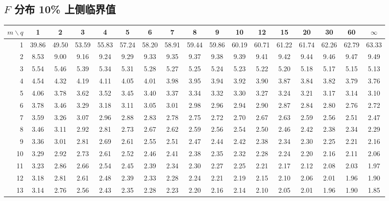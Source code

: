 \subsection{\texorpdfstring{$F$}{F} 分布 10\% 上侧临界值}
\begin{center}\scriptsize\setlength{\tabcolsep}{2.6pt}\renewcommand{\arraystretch}{1.0}\label{tab:f10}
\begin{tabular}{r|cccccccccccccccc}\toprule
$m\backslash q$ & 1 & 2 & 3 & 4 & 5 & 6 & 7 & 8 & 9 & 10 & 12 & 15 & 20 & 30 & 60 & $\infty$\\\midrule
1 & 39.86 & 49.50 & 53.59 & 55.83 & 57.24 & 58.20 & 58.91 & 59.44 & 59.86 & 60.19 & 60.71 & 61.22 & 61.74 & 62.26 & 62.79 & 63.33\\
2 & 8.53 & 9.00 & 9.16 & 9.24 & 9.29 & 9.33 & 9.35 & 9.37 & 9.38 & 9.39 & 9.41 & 9.42 & 9.44 & 9.46 & 9.47 & 9.49\\
3 & 5.54 & 5.46 & 5.39 & 5.34 & 5.31 & 5.28 & 5.27 & 5.25 & 5.24 & 5.23 & 5.22 & 5.20 & 5.18 & 5.17 & 5.15 & 5.13\\
4 & 4.54 & 4.32 & 4.19 & 4.11 & 4.05 & 4.01 & 3.98 & 3.95 & 3.94 & 3.92 & 3.90 & 3.87 & 3.84 & 3.82 & 3.79 & 3.76\\
5 & 4.06 & 3.78 & 3.62 & 3.52 & 3.45 & 3.40 & 3.37 & 3.34 & 3.32 & 3.30 & 3.27 & 3.24 & 3.21 & 3.17 & 3.14 & 3.10\\
6 & 3.78 & 3.46 & 3.29 & 3.18 & 3.11 & 3.05 & 3.01 & 2.98 & 2.96 & 2.94 & 2.90 & 2.87 & 2.84 & 2.80 & 2.76 & 2.72\\
7 & 3.59 & 3.26 & 3.07 & 2.96 & 2.88 & 2.83 & 2.78 & 2.75 & 2.72 & 2.70 & 2.67 & 2.63 & 2.59 & 2.56 & 2.51 & 2.47\\
8 & 3.46 & 3.11 & 2.92 & 2.81 & 2.73 & 2.67 & 2.62 & 2.59 & 2.56 & 2.54 & 2.50 & 2.46 & 2.42 & 2.38 & 2.34 & 2.29\\
9 & 3.36 & 3.01 & 2.81 & 2.69 & 2.61 & 2.55 & 2.51 & 2.47 & 2.44 & 2.42 & 2.38 & 2.34 & 2.30 & 2.25 & 2.21 & 2.16\\
10 & 3.29 & 2.92 & 2.73 & 2.61 & 2.52 & 2.46 & 2.41 & 2.38 & 2.35 & 2.32 & 2.28 & 2.24 & 2.20 & 2.16 & 2.11 & 2.06\\
11 & 3.23 & 2.86 & 2.66 & 2.54 & 2.45 & 2.39 & 2.34 & 2.30 & 2.27 & 2.25 & 2.21 & 2.17 & 2.12 & 2.08 & 2.03 & 1.97\\
12 & 3.18 & 2.81 & 2.61 & 2.48 & 2.39 & 2.33 & 2.28 & 2.24 & 2.21 & 2.19 & 2.15 & 2.10 & 2.06 & 2.01 & 1.96 & 1.90\\
13 & 3.14 & 2.76 & 2.56 & 2.43 & 2.35 & 2.28 & 2.23 & 2.20 & 2.16 & 2.14 & 2.10 & 2.05 & 2.01 & 1.96 & 1.90 & 1.85\\

\end{tabular}
\end{center}
